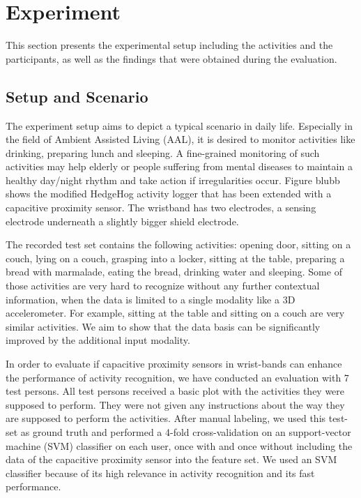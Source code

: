 \documentclass[runningheads,a4paper]{llncs}
\begin{document}
\section{Experiment}

This section presents the experimental setup including the activities and the participants, as well as the findings that were obtained during the evaluation.

\subsection{Setup and Scenario}

The experiment setup aims to depict a typical scenario in daily life. Especially in the field of Ambient Assisted Living (AAL), it is desired to monitor activities like drinking, preparing lunch and sleeping. A fine-grained monitoring of such activities may help elderly or people suffering from mental diseases to maintain a healthy day/night rhythm and take action if irregularities occur. Figure blubb shows the modified HedgeHog activity logger that has been extended with a capacitive proximity sensor. The wristband has two electrodes, a sensing electrode underneath a slightly bigger shield electrode. 

The recorded test set contains the following activities: opening door, sitting on a couch, lying on a couch, grasping into a locker, sitting at the table, preparing a bread with marmalade, eating the bread, drinking water and sleeping. Some of those activities are very hard to recognize without any further contextual information, when the data is limited to a single modality like a 3D accelerometer. For example, sitting at the table and sitting on a couch are very similar activities. We aim to show that the data basis can be significantly improved by the additional input modality. 

In order to evaluate if capacitive proximity sensors in wrist-bands can enhance the performance of activity recognition, we have conducted an evaluation with 7 test persons. All test persons received a basic plot with the activities they were supposed to perform. They were not given any instructions about the way they are supposed to perform the activities. After manual labeling, we used this test-set as ground truth and performed a 4-fold cross-validation on an support-vector machine (SVM) classifier on each user, once with and once without including the data of the capacitive proximity sensor into the feature set. We used an SVM classifier because of its high relevance in activity recognition and its fast performance. 
\end{document}
